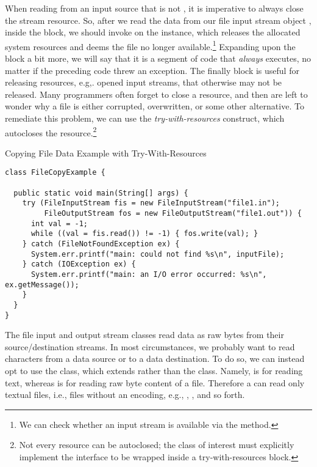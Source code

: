 When reading from an input source that is not , it is imperative to always close the stream resource. So, after we read the data from our file input stream object , inside the  block, we should invoke  on the instance, which releases the allocated system resources and deems the file no longer available.\footnote{We can check whether an input stream is available via the  method.} Expanding upon the  block a bit more, we will say that it is a segment of code that \textit{always} executes, no matter if the preceding code threw an exception. The finally block is useful for releasing resources, e.g,. opened input streams, that otherwise may not be released. Many programmers often forget to close a resource, and then are left to wonder why a file is either corrupted, overwritten, or some other alternative. To remediate this problem, we can use the \textit{try-with-resources} construct, which autocloses the resource.\footnote{Not every resource can be autoclosed; the class of interest must explicitly implement the  interface to be wrapped inside a try-with-resources block.}


\begin{cl}[]{Copying File Data Example with Try-With-Resources}
\begin{lstlisting}[language=MyJava]
class FileCopyExample {

  public static void main(String[] args) {
    try (FileInputStream fis = new FileInputStream("file1.in");
         FileOutputStream fos = new FileOutputStream("file1.out")) {
      int val = -1;
      while ((val = fis.read()) != -1) { fos.write(val); }
    } catch (FileNotFoundException ex) {
      System.err.printf("main: could not find %s\n", inputFile);
    } catch (IOException ex) {
      System.err.printf("main: an I/O error occurred: %s\n", ex.getMessage());
    }
  }
}
\end{lstlisting}
\end{cl}

The file input and output stream classes read data as raw bytes from their source/destination streams. In most circumstances, we probably want to read characters from a data source or to a data destination. To do so, we can instead opt to use the  class, which extends  rather than the  class. Namely,  is for reading text, whereas  is for reading raw byte content of a file. Therefore a  can read only textual files, i.e., files without an encoding, e.g., , , and so forth.

